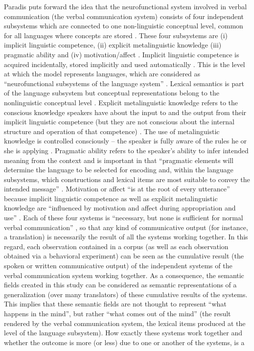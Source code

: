 Paradis puts forward the idea that the neurofunctional system involved in verbal communication (the verbal communication system) consists of four independent subsystems which are connected to one non-linguistic conceptual level, common for all languages where concepts are stored \citep[199]{kecskes_neurofunctional_2007}. These four subsystems are (i) implicit linguistic competence, (ii) explicit metalinguistic knowledge (iii) pragmatic ability and (iv) motivation/affect \citep[3]{paradis_neurolinguistic_2004, kecskes_neurofunctional_2007}. Implicit linguistic competence is acquired incidentally, stored implicitly and used automatically \citep[3--4]{kecskes_neurofunctional_2007}. This is the level at which the model represents languages, which are considered as “neurofunctional subsystems of the language system” \citep[225]{kecskes_neurofunctional_2007}. Lexical semantics is part of the language subsystem but conceptual representations belong to the nonlinguistic conceptual level \citep[199]{kecskes_neurofunctional_2007}. Explicit metalinguistic knowledge refers to the conscious knowledge speakers have about the input to and the output from their implicit linguistic competence (but they are not conscious about the internal structure and operation of that competence) \citep[4]{kecskes_neurofunctional_2007}. The use of metalinguistic knowledge is controlled consciously – the speaker is fully aware of the rules he or she is applying \citep[222]{paradis_neurolinguistic_2004}. Pragmatic ability refers to the speaker’s ability to infer intended meaning from the context \citep[4]{kecskes_neurofunctional_2007} and is important in that “pragmatic elements will determine the language to be selected for encoding and, within the language subsystems, which constructions and lexical items are most suitable to convey the intended message” \citep[222]{paradis_neurolinguistic_2004}. Motivation or affect “is at the root of every utterance” \citep[5]{kecskes_neurofunctional_2007} because implicit linguistic competence as well as explicit metalinguistic knowledge are “influenced by motivation and affect during appropriation and use” \citep[222]{paradis_neurolinguistic_2004}. Each of these four systems is “necessary, but none is sufficient for normal verbal communication” \citep[5]{kecskes_neurofunctional_2007}, so that any kind of communicative output (for instance, a translation) is necessarily the result of all the systems working together. In this regard, each observation contained in a corpus (as well as each observation obtained via a behavioral experiment) can be seen as the cumulative result (the spoken or written communicative output) of the independent systems of the verbal communication system working together. As a consequence, the semantic fields created in this study can be considered as semantic representations of a generalization (over many translators) of these cumulative results of the systems. This implies that these semantic fields are not thought to represent ``what happens in the mind'', but rather ``what comes out of the mind'' (the result rendered by the verbal communication system, the lexical items produced at the level of the language subsystem). How exactly these systems work together and whether the outcome is more (or less) due to one or another of the systems, is a 